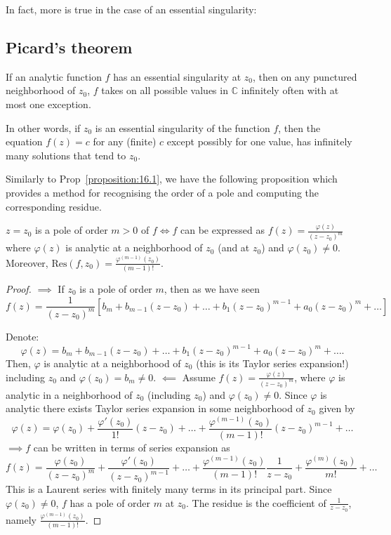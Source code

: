 In fact, more is true in the case of an essential singularity:

\subsection{Picard's theorem}
\begin{theorem}\label{theorem:great.picard}
    If an analytic function $f$ has an essential singularity at $z_0$, then on any punctured neighborhood of $z_0$, $f$ takes on all possible 
    values in $\mathbb{C}$ infinitely often with at most one exception.
\end{theorem}

In other words, if $z_0$ is an essential singularity of the function $f$, then the equation $f(z) = c$ for any (finite) $c$ except possibly for one value, has infinitely many solutions that tend to $z_0$.

Similarly to Prop~\ref{proposition:16.1}, we have the following proposition which provides a method for recognising the order of a pole and computing the corresponding residue.

\begin{proposition}\label{proposition:16.2} 
    $z = z_0$ is a pole of order $m > 0$ of $f \iff f$ can be expressed as $f(z) = \frac{\varphi(z)}{(z - z_0)^m}$ where $\varphi(z)$ is analytic 
    at a neighborhood of $z_0$ (and at $z_0$) and $\varphi(z_0) \neq 0$. Moreover, $\text{Res}(f, z_0) = \frac{\varphi^{(m-1)}(z_0)}{(m-1)!}$.
\end{proposition}
\begin{proof}
$\implies$ If $z_0$ is a pole of order $m$, then as we have seen 
\[ f(z) = \frac{1}{(z - z_0)^m} [b_m + b_{m-1}(z - z_0) + \dots + b_1(z - z_0)^{m-1} + a_0(z - z_0)^m + \dots] \]

Denote: \[ \varphi(z) = b_m + b_{m-1}(z - z_0) + \dots + b_1(z - z_0)^{m-1} + a_0(z - z_0)^m + \dots.\]
Then, $\varphi$ is analytic at a neighborhood of $z_0$ (this is its Taylor series expansion!) including $z_0$ and $\varphi(z_0) = b_m \neq 0$.
$\impliedby$ Assume $f(z) = \frac{\varphi(z)}{(z - z_0)^m}$, where $\varphi$ is analytic in a neighborhood of $z_0$ (including $z_0$) and $\varphi(z_0) \neq 0$. Since $\varphi$ is analytic 
there exists Taylor series expansion in some neighborhood of $z_0$ given by
\[ \varphi(z) = \varphi(z_0) + \frac{\varphi'(z_0)}{1!}(z - z_0) + \dots + \frac{\varphi^{(m-1)}(z_0)}{(m-1)!}(z - z_0)^{m-1} + \dots\]
$\implies f$ can be written in terms of series expansion as 
\[ f(z) = \frac{\varphi(z_0)}{(z - z_0)^m} + \frac{\varphi'(z_0)}{(z - z_0)^{m-1}} + \dots + \frac{\varphi^{(m-1)}(z_0)}{(m-1)!} \frac{1}{z - z_0} + \frac{\varphi^{(m)}(z_0)}{m!} + \dots \]
This is a Laurent series with finitely many terms in its principal part. Since $\varphi(z_0) \neq 0$, $f$ has a pole of order $m$ at $z_0$. The residue is the coefficient of $\frac{1}{z - z_0}$, 
namely $\frac{\varphi^{(m-1)}(z_0)}{(m-1)!}$.
\end{proof}

